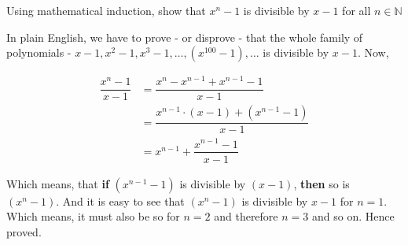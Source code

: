 
\question Using mathematical induction, show that $x^n-1$ is divisible by $x-1$ for all $n\in\mathbb{N}$

\insertQR{}

\begin{solution}
  In plain English, we have to prove - or disprove - that the whole family of polynomials
  - $x-1, x^2-1, x^3-1,\ldots, (x^{100}-1),\ldots$ is divisible by $x-1$. Now,

  \begin{align}
    \dfrac{x^n-1}{x-1} &= \dfrac{x^n - x^{n-1} + x^{n-1} - 1}{x-1} \\
                       &= \dfrac{x^{n-1}\cdot (x-1) + (x^{n-1} - 1)}{x - 1} \\
                       &= x^{n-1} + \dfrac{x^{n-1} - 1}{x-1}
  \end{align}
  
  Which means, that \textbf{if} $(x^{n-1}-1)$ is divisible by $(x-1)$, \textbf{then} so is $(x^n-1)$. 
  And it is easy to see that $(x^n-1)$ is divisible by $x-1$ for $n=1$. Which means, it must 
  also be so for $n=2$ and therefore $n=3$ and so on. Hence proved.
\end{solution}

